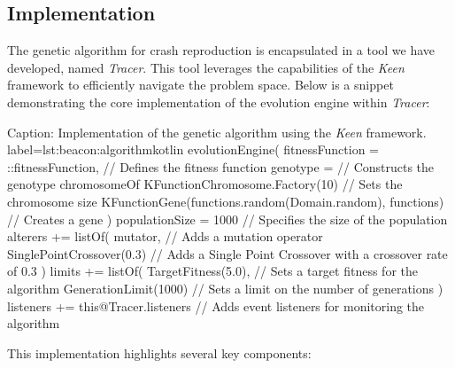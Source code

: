     \subsection{Implementation}
        The genetic algorithm for crash reproduction is encapsulated in a tool we have developed, named \textit{Tracer}. 
        This tool leverages the capabilities of the \textit{Keen} framework to efficiently navigate the problem space. 
        Below is a snippet demonstrating the core implementation of the evolution engine within \textit{Tracer}:
    
        \begin{code}{%
            Caption: Implementation of the genetic algorithm using the \textit{Keen} framework.
        }{label=lst:beacon:algorithm}{kotlin}
            evolutionEngine(
                fitnessFunction = ::fitnessFunction, // Defines the fitness function
                genotype = { // Constructs the genotype
                    chromosomeOf {
                        KFunctionChromosome.Factory(10) { // Sets the chromosome size
                            KFunctionGene(functions.random(Domain.random), functions) // Creates a gene
                        }
                    }
                }
            ) {
                populationSize = 1000 // Specifies the size of the population
                alterers += listOf(
                    mutator, // Adds a mutation operator
                    SinglePointCrossover(0.3) // Adds a Single Point Crossover with a crossover rate of 0.3
                )
                limits += listOf(
                    TargetFitness(5.0), // Sets a target fitness for the algorithm
                    GenerationLimit(1000) // Sets a limit on the number of generations
                )
                listeners += this@Tracer.listeners // Adds event listeners for monitoring the algorithm
            }
        \end{code}
    
        This implementation highlights several key components:

